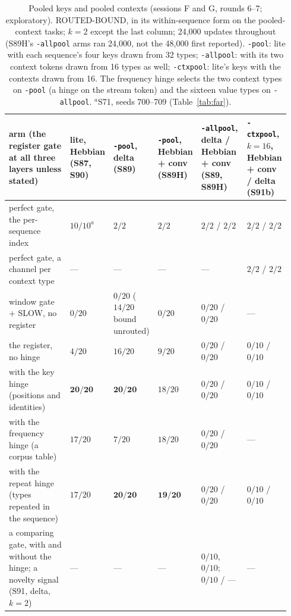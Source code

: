 \documentclass[11pt]{article}
\begin{document}
\begin{table}[H]
\centering
\scriptsize
\setlength{\tabcolsep}{2.5pt}
\begin{tabular}{@{}>{\raggedright\arraybackslash}p{0.27\linewidth}>{\centering\arraybackslash}p{0.1\linewidth}>{\centering\arraybackslash}p{0.13\linewidth}>{\centering\arraybackslash}p{0.12\linewidth}>{\centering\arraybackslash}p{0.17\linewidth}>{\centering\arraybackslash}p{0.15\linewidth}@{}}
\toprule
arm (the register gate at all three layers unless stated) & lite, Hebbian (S87, S90) & \texttt{-pool}, delta (S89) & \texttt{-pool}, Hebbian + conv (S89H) & \texttt{-allpool}, delta / Hebbian + conv (S89, S89H) & \texttt{-ctxpool}, $k{=}16$, Hebbian + conv / delta (S91b)\\
\midrule
perfect gate, the per-sequence index & $10/10^{a}$ & $2/2$ & $2/2$ & $2/2$ / $2/2$ & $2/2$ / $2/2$\\
perfect gate, a channel per context type & --- & --- & --- & --- & $2/2$ / $2/2$\\
window gate + SLOW, no register & $0/20$ & $0/20$ ($14/20$ bound unrouted) & $0/20$ & $0/20$ / $0/20$ & ---\\
the register, no hinge & $4/20$ & $16/20$ & $9/20$ & $0/20$ / $0/20$ & $0/10$ / $0/10$\\
with the key hinge (positions and identities) & $\mathbf{20/20}$ & $\mathbf{20/20}$ & $18/20$ & $0/20$ / $0/20$ & $0/10$ / $0/10$\\
with the frequency hinge (a corpus table) & $17/20$ & $7/20$ & $18/20$ & $0/20$ / $0/20$ & ---\\
with the repeat hinge (types repeated in the sequence) & $17/20$ & $\mathbf{20/20}$ & $\mathbf{19/20}$ & $0/20$ / $0/20$ & $0/10$ / $0/10$\\
a comparing gate, with and without the hinge; a novelty signal (S91, delta, $k{=}2$) & --- & --- & --- & $0/10$, $0/10$; $0/10$ / --- & ---\\
\bottomrule
\end{tabular}
\caption{Pooled keys and pooled contexts (sessions F and G, rounds 6--7; exploratory). ROUTED-BOUND, in its within-sequence form on the pooled-context tasks; $k = 2$ except the last column; 24{,}000 updates throughout (S89H's \texttt{-allpool} arms ran 24{,}000, not the 48{,}000 first reported). \texttt{-pool}: lite with each sequence's four keys drawn from 32 types; \texttt{-allpool}: with its two context tokens drawn from 16 types as well; \texttt{-ctxpool}: lite's keys with the contexts drawn from 16. The frequency hinge selects the two context types on \texttt{-pool} (a hinge on the stream token) and the sixteen value types on \texttt{-allpool}. $^{a}$S71, seeds 700--709 (Table~\ref{tab:far}).}
\label{tab:pool}
\end{table}
\end{document}
